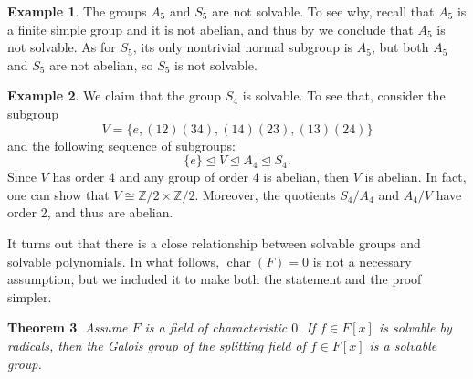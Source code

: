 \documentclass[12pt]{report}
\newtheorem{theorem}{Theorem}[chapter]
\numberwithin{equation}{section}
\numberwithin{theorem}{chapter}
\theoremstyle{definition}
\newtheorem{example}[theorem]{Example}
\newtheorem*{basic properties}{Basic Properties}
\newtheorem*{Important Remark}{Important Remark}
\DeclareMathOperator{\ch}{char}
\def\nsg{\unlhd}
\begin{document}
\begin{example}
The groups $A_5$ and $S_5$ are not solvable. To see why, recall that $A_5$ is a finite simple group and it is not abelian, and thus by  we conclude that $A_5$ is not solvable. As for $S_5$, its only nontrivial normal subgroup is $A_5$, but both $A_5$ and $S_5$ are not abelian, so $S_5$ is not solvable.
\end{example}


\begin{example}
We claim that the group $S_4$ is solvable. To see that, consider the subgroup
$$V=\{e,(12)(34),(14)(23),(13)(24)\}$$
and the following sequence of subgroups:
$$\{e\}\nsg V\nsg A_4\nsg S_4.$$
Since $V$ has order $4$ and any group of order $4$ is abelian, then $V$ is abelian. In fact, one can show that $V \cong \mathbb{Z}/2 \times \mathbb{Z}/2$. Moreover, the quotients $S_4/A_4$ and $A_4/V$ have order 2, and thus are abelian.
\end{example}



It turns out that there is a close relationship between solvable groups and solvable polynomials. In what follows, $\ch(F) = 0$ is not a necessary assumption, but we included it to make both the statement and the proof simpler.

\begin{theorem}\label{solvable by radicals implies solvable}
Assume $F$ is a field of characteristic $0$. If $f \in F[x]$ is solvable by radicals, then the Galois group of the splitting field of $f \in F[x]$ is a solvable group.
\end{theorem}
\end{document}
